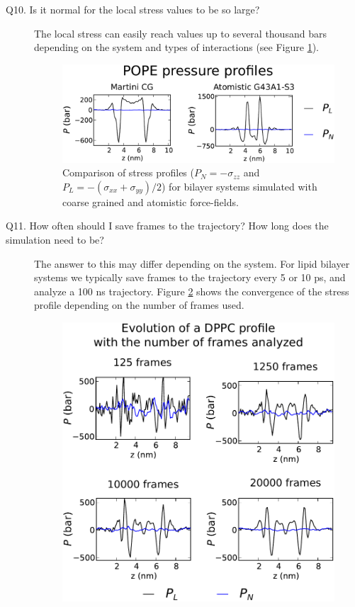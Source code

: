 \documentclass[10pt,letterpaper,notitlepage]{article}
\begin{document}
\begin{description}
\item[Q10. Is it normal for the local stress values to be so large?] The local stress can easily reach values up to several thousand bars depending on the system and types of interactions (see Figure \ref{CGvsUA}).

\begin{figure}[!ht]
\centering
\includegraphics[width=5.5in]{figs/tot.pdf}
\caption{Comparison of stress profiles ($P_N = -\sigma_{zz}$ and $P_L = -(\sigma_{xx} + \sigma_{yy})/2$) for bilayer systems simulated with coarse grained and atomistic force-fields.}\label{CGvsUA}
\end{figure}

\item[Q11. How often should I save frames to the trajectory? How long does the simulation need to be?] The answer to this may differ depending on the system. For lipid bilayer systems we typically save frames to the trajectory every 5 or 10 ps, and analyze a 100 ns trajectory. Figure \ref{convergence} shows the convergence of the stress profile depending on the number of frames used.

 \begin{figure}[!ht]
 \centering
 \includegraphics[width=4in]{figs/evol.pdf}
 \caption{} \label{convergence}
 \end{figure}


\end{description}
\end{document}
